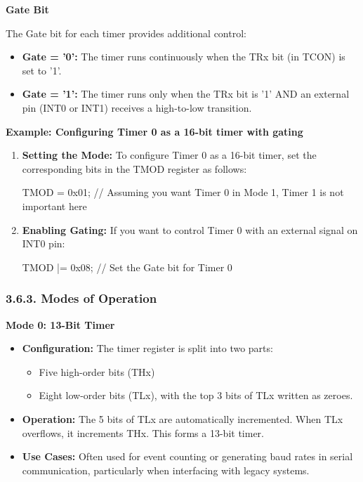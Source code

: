 \documentclass[
]{article}
\newenvironment{Shaded}{}{}
\newcommand{\NormalTok}[1]{#1}
\begin{document}
\textbf{Gate Bit}

The Gate bit for each timer provides additional control:

\begin{itemize}
\item
  \textbf{Gate = '0':} The timer runs continuously when the TRx bit (in
  TCON) is set to '1'.
\item
  \textbf{Gate = '1':} The timer runs only when the TRx bit is '1' AND
  an external pin (INT0 or INT1) receives a high-to-low transition.
\end{itemize}

\textbf{Example: Configuring Timer 0 as a 16-bit timer with gating}

\begin{enumerate}
\def\labelenumi{\arabic{enumi}.}
\item
  \textbf{Setting the Mode:} To configure Timer 0 as a 16-bit timer, set
  the corresponding bits in the TMOD register as follows:

\begin{Shaded}
\begin{Highlighting}[]
\NormalTok{TMOD = 0x01; // Assuming you want Timer 0 in Mode 1, Timer 1 is not important here}
\end{Highlighting}
\end{Shaded}
\item
  \textbf{Enabling Gating:} If you want to control Timer 0 with an
  external signal on INT0 pin:

\begin{Shaded}
\begin{Highlighting}[]
\NormalTok{TMOD |= 0x08; // Set the Gate bit for Timer 0}
\end{Highlighting}
\end{Shaded}
\end{enumerate}

\hypertarget{363-modes-of-operation}{%
\subsubsection{3.6.3. Modes of Operation}\label{363-modes-of-operation}}

\textbf{Mode 0: 13-Bit Timer}

\begin{itemize}
\item
  \textbf{Configuration:} The timer register is split into two parts:

  \begin{itemize}
  \item
    Five high-order bits (THx)
  \item
    Eight low-order bits (TLx), with the top 3 bits of TLx written as
    zeroes.
  \end{itemize}
\item
  \textbf{Operation:} The 5 bits of TLx are automatically incremented.
  When TLx overflows, it increments THx. This forms a 13-bit timer.
\item
  \textbf{Use Cases:} Often used for event counting or generating baud
  rates in serial communication, particularly when interfacing with
  legacy systems.
\end{itemize}
\end{document}
